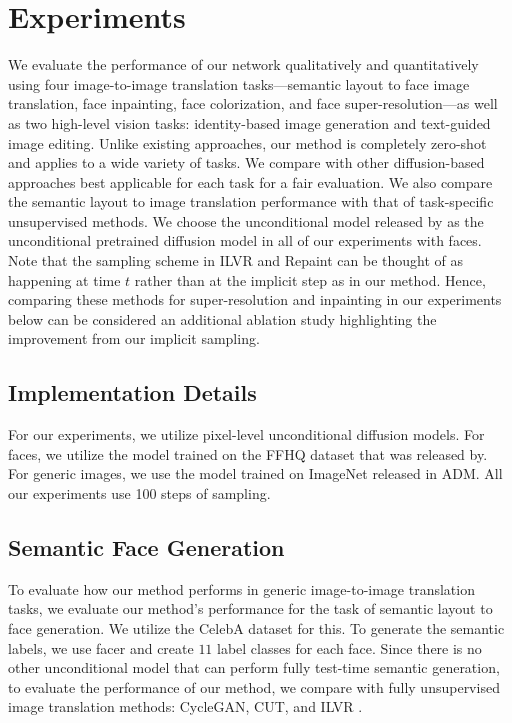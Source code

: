\documentclass[10pt,twocolumn,letterpaper]{article}
\begin{document}
\section{Experiments}
\label{sec:expts}
We evaluate the performance of our network qualitatively and quantitatively using four image-to-image translation tasks---semantic layout to face image translation, face inpainting, face colorization, and face super-resolution---as well as two high-level vision tasks: identity-based image generation and text-guided image editing. Unlike existing approaches, our method is completely zero-shot and applies to a wide variety of tasks. We compare with other diffusion-based approaches best applicable for each task for a fair evaluation. We also compare the semantic layout to image translation performance with that of task-specific unsupervised methods. We choose the unconditional model 
released by \cite{choi2021ilvr} as the unconditional pretrained diffusion model in all of our experiments with faces. Note that the sampling scheme in ILVR\cite{choi2021ilvr} and Repaint\cite{lugmayr2022repaint} can be thought of as happening at time $t$ rather than at the implicit step as in our method. Hence, comparing these methods for super-resolution and inpainting in our experiments below can be considered an additional ablation study highlighting the improvement from our implicit sampling. 

\subsection{Implementation Details}
For our experiments, we utilize pixel-level unconditional diffusion models. For faces, we utilize the model trained on the FFHQ dataset\cite{karras2019style} that was released by\cite{choi2021ilvr}. For generic images, we use the model trained on ImageNet\cite{deng2009imagenet} released in ADM\cite{dhariwal2021diffusion}. All our experiments use 100 steps of sampling.
\subsection{Semantic Face Generation}



To evaluate how our method performs in generic image-to-image translation tasks, we evaluate our method's performance for the task of semantic layout to face generation. We utilize the CelebA dataset for this. To generate the semantic labels, we use facer\cite{zheng2021farl} and create $11$ label classes for each face. Since there is no other unconditional model that can perform fully test-time semantic generation, to evaluate the performance of our method, we compare with fully unsupervised image translation methods: CycleGAN\cite{CycleGAN2017},  CUT\cite{park2020contrastive}, and ILVR \cite{choi2021ilvr}.
\end{document}
